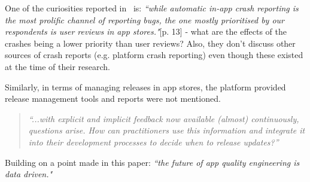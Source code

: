 One of the curiosities reported in~\textcite{alsubaihin2019app_store_effects_on_software_engineering} is: \emph{``while automatic in-app crash reporting is the most prolific channel of reporting bugs, the one mostly prioritised by our respondents is user reviews in app stores."}[p. 13] - what are the effects of the crashes being a lower priority than user reviews? Also, they don't discuss other sources of crash reports (e.g. platform crash reporting) even though these existed at the time of their research.

Similarly, in terms of managing releases in app stores, the platform provided release management tools and reports were not mentioned. 

\begin{quote}
    \emph{``...with explicit and implicit feedback now available (almost) continuously, questions arise. How can practitioners use this information and integrate it into their development processes to decide when to release updates?''}\cite[pp. 48-49]{maalej2016_towards_data_driven_requirements_engineering}    
\end{quote}

Building on a point made in this paper: \emph{``the future of app quality engineering is data driven."}~\cite[p. 24]{nagappan2016_future_trends_in_sw_eng_for_mobile_apps} %



